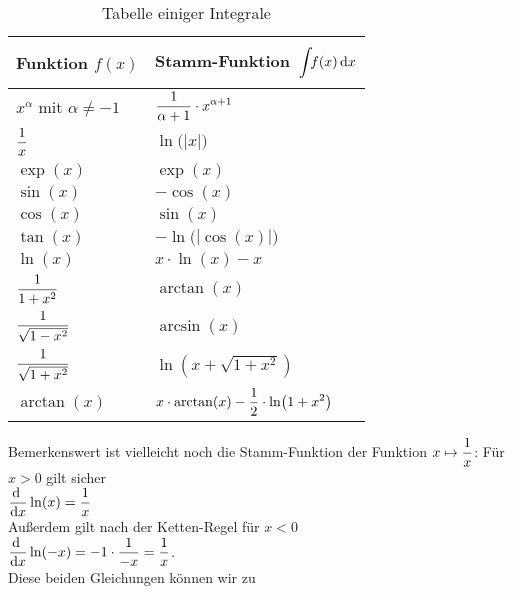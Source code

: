 \begin{table}[h]
  \centering
  \begin{tabular}[t]{|l|l|}
    \hline
    Funktion $f(x)$ & Stamm-Funktion $\ds \rule[-12pt]{0pt}{30pt}\int\!\! f(x) \, \dr x$ \\
    \hline
    \hline
    $x^\alpha$ mit $\alpha\not= -1$ & \rule[-12pt]{0pt}{30pt} $\displaystyle \frac{1}{\alpha + 1}\cdot x^{\alpha + 1}$ \\
    \hline
    $\displaystyle \frac{1}{x} $ & \rule[-12pt]{0pt}{30pt} $\ln\bigl(|x|\bigr)$ \\
    \hline
    $\exp(x)$                      & \rule[-6pt]{0pt}{18pt} $\exp(x)$ \\
    \hline
    $\sin(x)$                      & \rule[-6pt]{0pt}{18pt} $-\cos(x)$ \\
    \hline
    $\cos(x)$                      & \rule[-6pt]{0pt}{18pt} $\sin(x)$ \\
    \hline
    $\tan(x) $ & \rule[-6pt]{0pt}{18pt} $-\ln\bigl(|\cos(x)|\bigr)$ \\
    \hline
    $\ln(x)$ & \rule[-6pt]{0pt}{18pt} $x\cdot \ln(x) - x$ \\
    \hline
    $\displaystyle \frac{1}{1+x^2}$ & \rule[-12pt]{0pt}{30pt} $\arctan(x)$ \\
    \hline
    $\displaystyle \frac{1}{\sqrt{1-x^2}} $ & \rule[-14pt]{0pt}{30pt} $\arcsin(x)$ \\
    \hline
    $\displaystyle \frac{1}{\sqrt{1+x^2}} $ & \rule[-14pt]{0pt}{30pt} $ \ln  \left( x+\sqrt {1+{x}^{2}} \right) $ \\
    \hline
    $\arctan(x)$ & \rule[-12pt]{0pt}{30pt} $\displaystyle x\cdot \arctan(x) -\frac{1}{2}\cdot \ln\bigl( 1+{x}^{2} \bigr)$ \\
    \hline
  \end{tabular}
  \caption{Tabelle einiger Integrale}
  \label{tab:integrale}
\end{table}
Bemerkenswert ist vielleicht noch die Stamm-Funktion der Funktion $\displaystyle x \mapsto \frac{1}{x}$:
F\"ur $x>0$ gilt 
sicher 
\\[0.2cm]
\hspace*{1.3cm}
$\displaystyle\frac{\textrm{d}\;}{\textrm{d}x} \ln(x) = \frac{1}{x}$
\\[0.2cm]
Au{\ss}erdem gilt nach der Ketten-Regel f\"ur $x < 0$ 
\\[0.2cm]
\hspace*{1.3cm}
$\displaystyle\frac{\textrm{d}\;}{\textrm{d}x} \ln(-x) = -1 \cdot  \frac{1}{-x} = \frac{1}{x}$.
\\[0.2cm]
Diese beiden Gleichungen k\"onnen wir zu 
\\[0.2cm]
